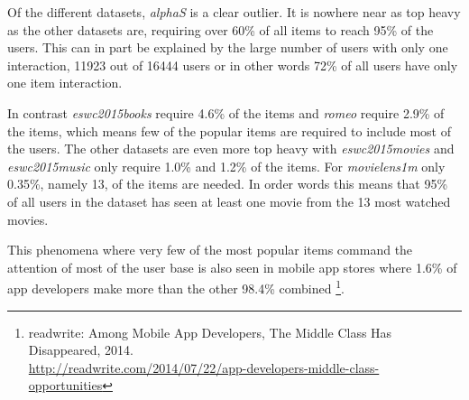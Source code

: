 Of the different datasets, \textit{alphaS} is a clear outlier. It is nowhere near as top heavy as the other datasets are, requiring over 60\% of all items to reach 95\% of the users. This can in part be explained by the large number of users with only one interaction, 11923 out of 16444 users or in other words 72\% of all users have only one item interaction.
    
In contrast \textit{eswc2015books} require 4.6\% of the items and \textit{romeo} require 2.9\% of the items, which means few of the popular items are required to include most of the users. The other datasets are even more top heavy with \textit{eswc2015movies} and \textit{eswc2015music} only require 1.0\% and 1.2\% of the items. For \textit{movielens1m} only 0.35\%, namely 13, of the items are needed. In order words this means that 95\% of all users in the dataset has seen at least one movie from the 13 most watched movies.

This phenomena where very few of the most popular items command the attention of most of the user base is also seen in mobile app stores where 1.6\% of app developers make more than the other 98.4\% combined
\footnote{
readwrite: Among Mobile App Developers, The Middle Class Has Disappeared, 2014. \\
\url{http://readwrite.com/2014/07/22/app-developers-middle-class-opportunities}
}.

\FloatBarrier
